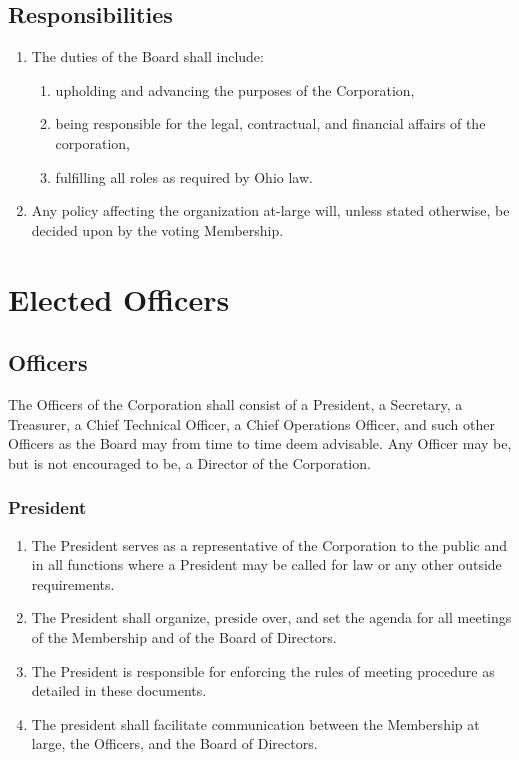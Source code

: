 \documentclass{article}
\begin{document}
\subsection{Responsibilities}
\begin{enumerate}
  \item The duties of the Board shall include:
  \begin{enumerate}
    \item upholding and advancing the purposes of the Corporation,
    \item being responsible for the legal, contractual, and financial affairs of
    the corporation,
    \item fulfilling all roles as required by Ohio law.
  \end{enumerate}
  \item Any policy affecting the organization at-large will, unless stated
  otherwise, be decided upon by the voting Membership.
\end{enumerate}
\section{Elected Officers}
\subsection{Officers}
The Officers of the Corporation shall consist of a President, a Secretary, a Treasurer, a 
Chief Technical Officer, a Chief Operations Officer, and such other Officers as the Board 
may from time to time deem advisable.  Any Officer may be, but is not encouraged to be, a 
Director of the Corporation.
\subsubsection{President}
\begin{enumerate}
  \item The President serves as a representative of the Corporation to the public and in all 
functions where a President may be called for law or any other outside requirements.
  \item The President shall organize, preside over, and set the agenda for all meetings of 
the Membership and of the Board of Directors.
  \item The President is responsible for enforcing the rules of meeting procedure as 
detailed in these documents.
  \item The president shall facilitate communication between the Membership at large, the 
Officers, and the Board of Directors.
\end{enumerate}
\end{document}
